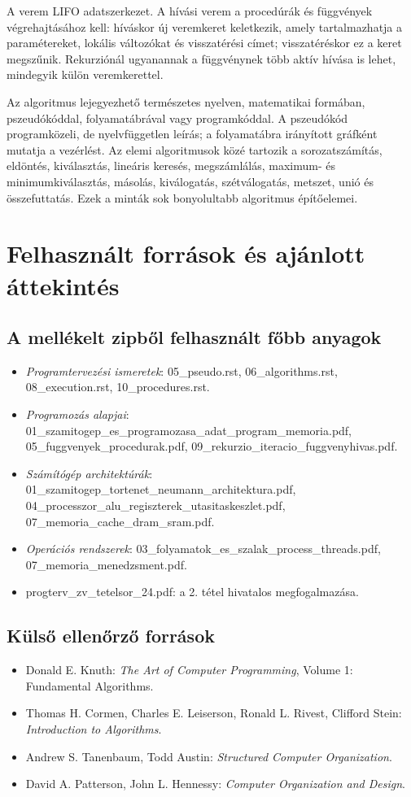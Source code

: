 A verem LIFO adatszerkezet. A hívási verem a procedúrák és függvények végrehajtásához kell: híváskor új veremkeret keletkezik, amely tartalmazhatja a paramétereket, lokális változókat és visszatérési címet; visszatéréskor ez a keret megszűnik. Rekurziónál ugyanannak a függvénynek több aktív hívása is lehet, mindegyik külön veremkerettel.

Az algoritmus lejegyezhető természetes nyelven, matematikai formában, pszeudókóddal, folyamatábrával vagy programkóddal. A pszeudókód programközeli, de nyelvfüggetlen leírás; a folyamatábra irányított gráfként mutatja a vezérlést. Az elemi algoritmusok közé tartozik a sorozatszámítás, eldöntés, kiválasztás, lineáris keresés, megszámlálás, maximum- és minimumkiválasztás, másolás, kiválogatás, szétválogatás, metszet, unió és összefuttatás. Ezek a minták sok bonyolultabb algoritmus építőelemei.

\section{Felhasznált források és ajánlott áttekintés}

\subsection*{A mellékelt zipből felhasznált főbb anyagok}

\begin{itemize}
  \item \emph{Programtervezési ismeretek}: 05\_pseudo.rst, 06\_algorithms.rst, 08\_execution.rst, 10\_procedures.rst.
  \item \emph{Programozás alapjai}: 01\_szamitogep\_es\_programozasa\_adat\_program\_memoria.pdf, 05\_fuggvenyek\_procedurak.pdf, 09\_rekurzio\_iteracio\_fuggvenyhivas.pdf.
  \item \emph{Számítógép architektúrák}: 01\_szamitogep\_tortenet\_neumann\_architektura.pdf, 04\_processzor\_alu\_regiszterek\_utasitaskeszlet.pdf, 07\_memoria\_cache\_dram\_sram.pdf.
  \item \emph{Operációs rendszerek}: 03\_folyamatok\_es\_szalak\_process\_threads.pdf, 07\_memoria\_menedzsment.pdf.
  \item progterv\_zv\_tetelsor\_24.pdf: a 2. tétel hivatalos megfogalmazása.
\end{itemize}

\subsection*{Külső ellenőrző források}

\begin{itemize}
  \item Donald E. Knuth: \emph{The Art of Computer Programming}, Volume 1: Fundamental Algorithms.
  \item Thomas H. Cormen, Charles E. Leiserson, Ronald L. Rivest, Clifford Stein: \emph{Introduction to Algorithms}.
  \item Andrew S. Tanenbaum, Todd Austin: \emph{Structured Computer Organization}.
  \item David A. Patterson, John L. Hennessy: \emph{Computer Organization and Design}.
\end{itemize}
